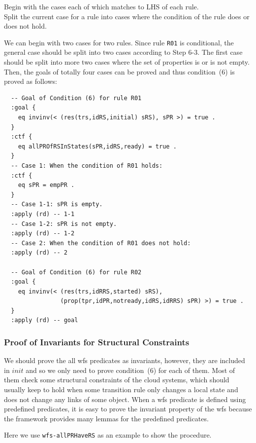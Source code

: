 \documentclass[12pt]{report}
\begin{document}
 Begin with the cases each of which matches to
LHS of each rule. \\ 
 Split the current case for a rule into
cases where the condition of the rule does or does not hold. 

We can begin with two cases for two rules. Since rule {\tt R01} is
conditional, the general case should be split into two cases according
to Step 6-3. The first case should be split into more two cases
where the set of properties is or is not empty.
Then, the goals of totally four cases can be proved and
thus condition~(6) is proved as follows:
\small
\begin{verbatim}
  -- Goal of Condition (6) for rule R01
  :goal {
    eq invinv(< (res(trs,idRS,initial) sRS), sPR >) = true .
  }
  :ctf {
    eq allPROfRSInStates(sPR,idRS,ready) = true .
  }
  -- Case 1: When the condition of R01 holds:
  :ctf {
    eq sPR = empPR .
  }
  -- Case 1-1: sPR is empty.
  :apply (rd) -- 1-1
  -- Case 1-2: sPR is not empty.
  :apply (rd) -- 1-2
  -- Case 2: When the condition of R01 does not hold:
  :apply (rd) -- 2

  -- Goal of Condition (6) for rule R02
  :goal {
    eq invinv(< (res(trs,idRRS,started) sRS),
                (prop(tpr,idPR,notready,idRS,idRRS) sPR) >) = true .
  }
  :apply (rd) -- goal
\end{verbatim}
\normalsize

\subsubsection*{Proof of Invariants for Structural Constraints}
We should prove the all wfs predicates as invariants, however, they are
included in $init$ and so we only need to prove
condition~(6) for each of them. Most of them check some
structural constraints of the cloud systems, which should usually keep
to hold when some transition rule only changes a local state and
does not change any links of some
object. When a wfs predicate is defined using predefined predicates, it
is easy to prove the invariant property of the wfs because the framework
provides many lemmas for the predefined predicates.

Here we use {\tt wfs-allPRHaveRS} as an example to show the procedure.\\
\end{document}
